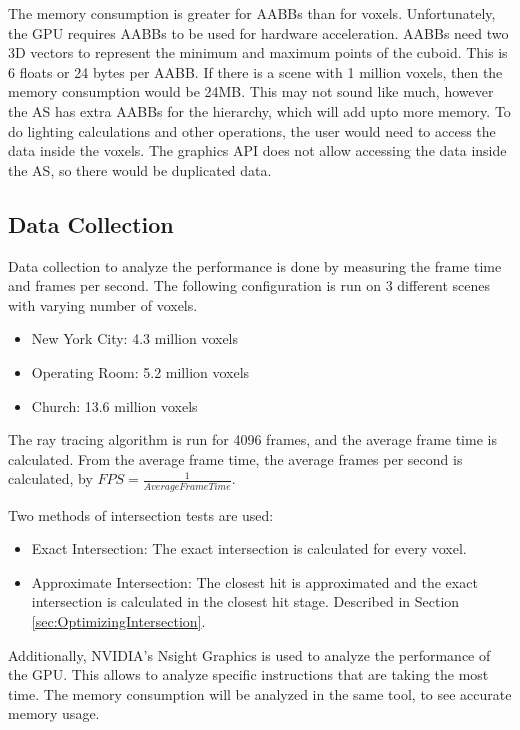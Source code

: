 \documentclass[12pt]{article}
\begin{document}
The memory consumption is greater for AABBs than for voxels.
Unfortunately, the GPU requires AABBs to be used for hardware acceleration.
AABBs need two 3D vectors to represent the minimum and maximum points of the cuboid.
This is 6 floats or 24 bytes per AABB.
If there is a scene with 1 million voxels, then the memory consumption would be 24MB.
This may not sound like much, however the AS has extra AABBs for the hierarchy, which will add upto more memory.
To do lighting calculations and other operations, the user would need to access the data inside the voxels.
The graphics API does not allow accessing the data inside the AS, so there would be duplicated data.

\subsection{Data Collection}

Data collection to analyze the performance is done by measuring the frame time and frames per second.
The following configuration is run on 3 different scenes with varying number of voxels.

\begin{itemize}
    \itemsep0em
    \item New York City: 4.3 million voxels
    \item Operating Room: 5.2 million voxels
    \item Church: 13.6 million voxels
\end{itemize}

The ray tracing algorithm is run for 4096 frames, and the average frame time is calculated.
From the average frame time, the average frames per second is calculated, by $FPS = \frac{1}{Average Frame Time}$.

Two methods of intersection tests are used:
\begin{itemize}
    \itemsep0em
    \item Exact Intersection: The exact intersection is calculated for every voxel.
    \item Approximate Intersection: The closest hit is approximated and the exact intersection is calculated in the closest hit stage.
    Described in Section \ref{sec:OptimizingIntersection}.
\end{itemize}

Additionally, NVIDIA's Nsight Graphics is used to analyze the performance of the GPU.
This allows to analyze specific instructions that are taking the most time.
The memory consumption will be analyzed in the same tool, to see accurate memory usage.
\end{document}
